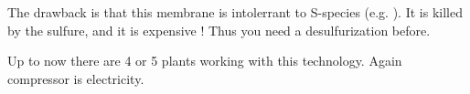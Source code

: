 \documentclass[10pt,a4paper]{article}
\begin{document}
The drawback is that this membrane is intolerrant to S-species (e.g. ). It is killed by the sulfure, and it is expensive ! Thus you need a desulfurization before.

Up to now there are 4 or 5 plants working with this technology. Again compressor is electricity.

\newpage




\end{document}
